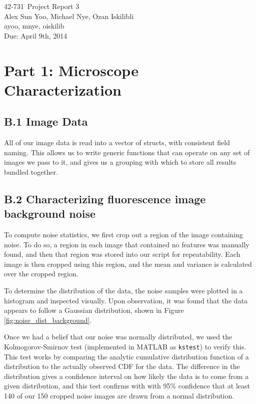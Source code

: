 \documentclass{article}
\newcommand{\hmwkTitle}{Project Report 3}
\newcommand{\hmwkDueDate}{April 9th, 2014}
\newcommand{\hmwkClass}{42-731}
\newcommand{\hmwkAuthor}{Alex Sun Yoo, Michael Nye, Ozan Iskilibli}
\newcommand{\hmwkEmail}{ayoo, mnye, oiskilib}
\newcommand{\hmwkCollaborators}{}
\begin{document}
\thispagestyle{plain}
\begin{center}
{\Large \hmwkClass\ \hmwkTitle} \\
\hmwkAuthor \\
\hmwkEmail \\
\ifthenelse{\equal{\hmwkCollaborators}{}}{}{Collaborators: \hmwkCollaborators\\}
Due: \hmwkDueDate\\
\end{center}

\section*{Part 1: Microscope Characterization}

\subsection*{B.1 Image Data}

All of our image data is read into a vector of structs, with consistent field naming. This allows us to write generic functions that can operate on any set of images we pass to it, and gives us a grouping with which to store all results bundled together.


\subsection*{B.2 Characterizing fluorescence image background noise}

To compute noise statistics, we first crop out a region of the image containing noise. To do so, a region in each image that contained no features was manually found, and then that region was stored into our script for repeatability. Each image is then cropped using this region, and the mean and variance is calculated over the cropped region.

To determine the distribution of the data, the noise samples were plotted in a histogram and inspected visually. Upon observation, it was found that the data appears to follow a Gaussian distribution, shown in Figure \ref{fig:noise_dist_background}.

Once we had a belief that our noise was normally distributed, we used the Kolmogorov-Smirnov test (implemented in MATLAB as \verb|kstest|) to verify this. This test works by comparing the analytic cumulative distribution function of a distribution to the actually observed CDF for the data. The difference in the distribution gives a confidence interval on how likely the data is to come from a given distribution, and this test confirms with with 95\% confidence that at least 140 of our 150 cropped noise images are drawn from a normal distribution.
\end{document}

